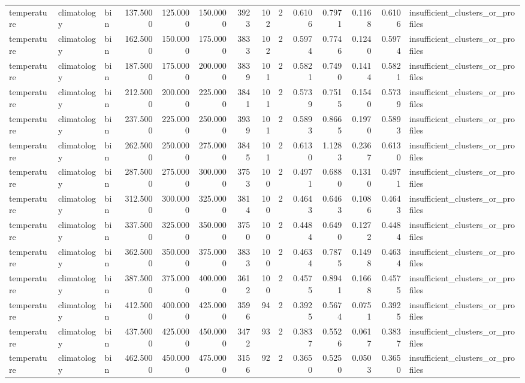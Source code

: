 \begin{tabular}{lllrrrrrrrrrrl}
temperature & climatology & bin & 137.5000 & 125.0000 & 150.0000 & 3923 & 102 & 2 & 0.6106 & 0.7971 & 0.1168 & 0.6106 & insufficient_clusters_or_profiles \\
temperature & climatology & bin & 162.5000 & 150.0000 & 175.0000 & 3833 & 102 & 2 & 0.5974 & 0.7746 & 0.1240 & 0.5974 & insufficient_clusters_or_profiles \\
temperature & climatology & bin & 187.5000 & 175.0000 & 200.0000 & 3839 & 101 & 2 & 0.5821 & 0.7490 & 0.1414 & 0.5821 & insufficient_clusters_or_profiles \\
temperature & climatology & bin & 212.5000 & 200.0000 & 225.0000 & 3841 & 101 & 2 & 0.5739 & 0.7515 & 0.1540 & 0.5739 & insufficient_clusters_or_profiles \\
temperature & climatology & bin & 237.5000 & 225.0000 & 250.0000 & 3939 & 101 & 2 & 0.5893 & 0.8665 & 0.1970 & 0.5893 & insufficient_clusters_or_profiles \\
temperature & climatology & bin & 262.5000 & 250.0000 & 275.0000 & 3845 & 101 & 2 & 0.6130 & 1.1283 & 0.2367 & 0.6130 & insufficient_clusters_or_profiles \\
temperature & climatology & bin & 287.5000 & 275.0000 & 300.0000 & 3753 & 100 & 2 & 0.4971 & 0.6880 & 0.1310 & 0.4971 & insufficient_clusters_or_profiles \\
temperature & climatology & bin & 312.5000 & 300.0000 & 325.0000 & 3814 & 100 & 2 & 0.4643 & 0.6463 & 0.1086 & 0.4643 & insufficient_clusters_or_profiles \\
temperature & climatology & bin & 337.5000 & 325.0000 & 350.0000 & 3750 & 100 & 2 & 0.4484 & 0.6490 & 0.1272 & 0.4484 & insufficient_clusters_or_profiles \\
temperature & climatology & bin & 362.5000 & 350.0000 & 375.0000 & 3833 & 100 & 2 & 0.4634 & 0.7875 & 0.1498 & 0.4634 & insufficient_clusters_or_profiles \\
temperature & climatology & bin & 387.5000 & 375.0000 & 400.0000 & 3612 & 100 & 2 & 0.4575 & 0.8941 & 0.1668 & 0.4575 & insufficient_clusters_or_profiles \\
temperature & climatology & bin & 412.5000 & 400.0000 & 425.0000 & 3596 & 94 & 2 & 0.3925 & 0.5674 & 0.0751 & 0.3925 & insufficient_clusters_or_profiles \\
temperature & climatology & bin & 437.5000 & 425.0000 & 450.0000 & 3472 & 93 & 2 & 0.3837 & 0.5526 & 0.0617 & 0.3837 & insufficient_clusters_or_profiles \\
temperature & climatology & bin & 462.5000 & 450.0000 & 475.0000 & 3156 & 92 & 2 & 0.3650 & 0.5250 & 0.0503 & 0.3650 & insufficient_clusters_or_profiles \\

\end{tabular}
